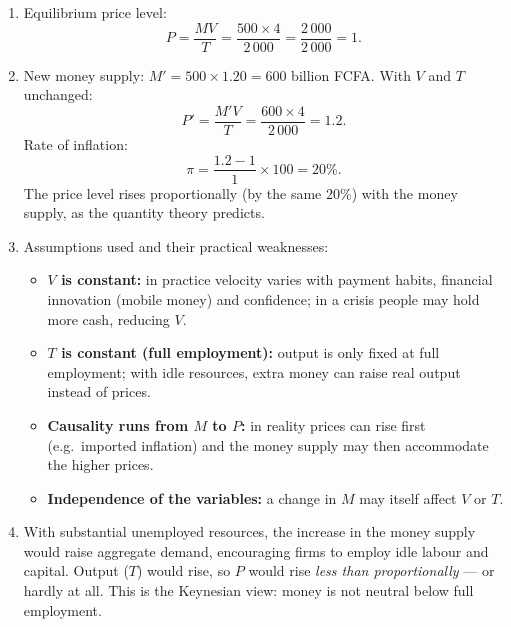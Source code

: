 \documentclass[11pt]{article}
\begin{document}
\begin{corrige}
\begin{enumerate}
\item Equilibrium price level:
\[ P = \frac{MV}{T} = \frac{500 \times 4}{2\,000} = \frac{2\,000}{2\,000} = 1. \]
\item New money supply: $M' = 500 \times 1.20 = 600$ billion FCFA. With $V$ and $T$ unchanged:
\[ P' = \frac{M'V}{T} = \frac{600 \times 4}{2\,000} = 1.2. \]
Rate of inflation:
\[ \pi = \frac{1.2 - 1}{1} \times 100 = 20\%. \]
The price level rises proportionally (by the same $20\%$) with the money supply, as the quantity theory predicts.
\item Assumptions used and their practical weaknesses:
\begin{itemize}
\item \textbf{$V$ is constant:} in practice velocity varies with payment habits, financial innovation (mobile money) and confidence; in a crisis people may hold more cash, reducing $V$.
\item \textbf{$T$ is constant (full employment):} output is only fixed at full employment; with idle resources, extra money can raise real output instead of prices.
\item \textbf{Causality runs from $M$ to $P$:} in reality prices can rise first (e.g.\ imported inflation) and the money supply may then accommodate the higher prices.
\item \textbf{Independence of the variables:} a change in $M$ may itself affect $V$ or $T$.
\end{itemize}
\item With substantial unemployed resources, the increase in the money supply would raise aggregate demand, encouraging firms to employ idle labour and capital. Output ($T$) would rise, so $P$ would rise \emph{less than proportionally} — or hardly at all. This is the Keynesian view: money is not neutral below full employment.
\end{enumerate}
\end{corrige}
\end{document}
